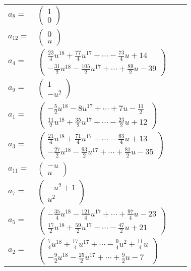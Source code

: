 \documentclass[1p]{elsarticle_modified}
\theoremstyle{definition}
\begin{document}
\begin{tabular}{m{7pt} m{180pt} m{7pt} m{180pt} }
\flushright $a_{8}=$&$\begin{pmatrix}1\\0\end{pmatrix}$ \\
\flushright $a_{12}=$&$\begin{pmatrix}0\\u\end{pmatrix}$ \\
\flushright $a_{4}=$&$\begin{pmatrix}\frac{23}{4} u^{18}+\frac{77}{4} u^{17}+\cdots-\frac{73}{4} u+14\\-\frac{31}{2} u^{18}-\frac{105}{2} u^{17}+\cdots+\frac{89}{2} u-39\end{pmatrix}$ \\
\flushright $a_{9}=$&$\begin{pmatrix}1\\- u^2\end{pmatrix}$ \\
\flushright $a_{1}=$&$\begin{pmatrix}-\frac{5}{2} u^{18}-8 u^{17}+\cdots+7 u-\frac{11}{2}\\\frac{11}{2} u^{18}+\frac{35}{2} u^{17}+\cdots-\frac{23}{2} u+12\end{pmatrix}$ \\
\flushright $a_{3}=$&$\begin{pmatrix}\frac{21}{4} u^{18}+\frac{71}{4} u^{17}+\cdots-\frac{63}{4} u+13\\-\frac{27}{2} u^{18}-\frac{93}{2} u^{17}+\cdots+\frac{81}{2} u-35\end{pmatrix}$ \\
\flushright $a_{11}=$&$\begin{pmatrix}- u\\u\end{pmatrix}$ \\
\flushright $a_{7}=$&$\begin{pmatrix}- u^2+1\\u^2\end{pmatrix}$ \\
\flushright $a_{5}=$&$\begin{pmatrix}-\frac{35}{4} u^{18}-\frac{121}{4} u^{17}+\cdots+\frac{97}{4} u-23\\\frac{17}{2} u^{18}+\frac{59}{2} u^{17}+\cdots-\frac{47}{2} u+21\end{pmatrix}$ \\
\flushright $a_{2}=$&$\begin{pmatrix}\frac{7}{4} u^{18}+\frac{17}{4} u^{17}+\cdots-\frac{9}{4} u^2+\frac{11}{4} u\\-\frac{9}{2} u^{18}-\frac{25}{2} u^{17}+\cdots+\frac{9}{2} u-7\end{pmatrix}$ \\

\end{tabular}
\end{document}
